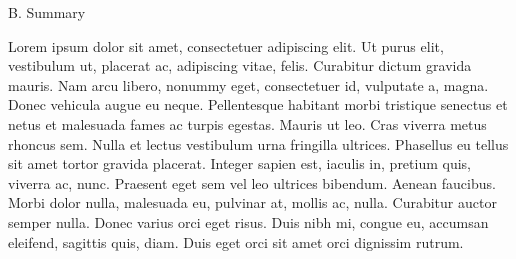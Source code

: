 \documentclass{proposal}
\begin{document}
  \begin{center}\leavevmode
    \normalfont
    { B. Summary }%
  \end{center}%
 
%
  
  
\noindent%


Lorem ipsum dolor sit amet, consectetuer adipiscing elit. Ut purus elit, vestibulum ut, placerat ac, adipiscing vitae, felis. Curabitur dictum gravida mauris. Nam arcu libero, nonummy eget, consectetuer id, vulputate a, magna. Donec vehicula augue eu neque. Pellentesque habitant morbi tristique senectus et netus et malesuada fames ac turpis egestas. Mauris ut leo. Cras viverra metus rhoncus sem. Nulla et lectus vestibulum urna fringilla ultrices. Phasellus eu tellus sit amet tortor gravida placerat. Integer sapien est, iaculis in, pretium quis, viverra ac, nunc. Praesent eget sem vel leo ultrices bibendum. Aenean faucibus. Morbi dolor nulla, malesuada eu, pulvinar at, mollis ac, nulla. Curabitur auctor semper nulla. Donec varius orci eget risus. Duis nibh mi, congue eu, accumsan eleifend, sagittis quis, diam. Duis eget orci sit amet orci dignissim rutrum.



\vspace{3ex}
\vspace{1mm}

\noindent 
\lipsum[2]


\vspace{3ex}
\vspace{1mm}

\noindent %
\lipsum[3]
\end{document}
